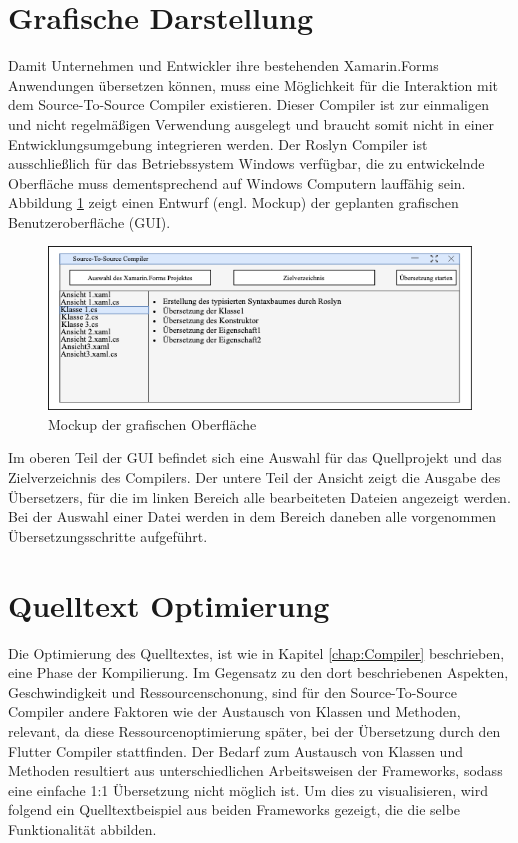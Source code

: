 \section{Grafische Darstellung}
Damit Unternehmen und Entwickler ihre bestehenden Xamarin.Forms Anwendungen übersetzen können, muss eine Möglichkeit für die Interaktion mit dem Source-To-Source Compiler existieren.  Dieser Compiler ist zur einmaligen und nicht regelmäßigen Verwendung ausgelegt und braucht somit nicht in einer Entwicklungsumgebung integrieren werden.  Der Roslyn Compiler ist ausschließlich für das Betriebssystem Windows verfügbar,  die zu entwickelnde Oberfläche muss dementsprechend auf Windows Computern lauffähig sein.  Abbildung \ref{fig:UiMockup} zeigt einen Entwurf (engl. Mockup) der geplanten grafischen Benutzeroberfläche (GUI).

\begin{figure}[!ht]
 \includegraphics[width=\textwidth,keepaspectratio]{Images/CompilerArchitecture/Mockup.png}
 \caption{Mockup der grafischen Oberfläche}
 \label{fig:UiMockup}
\end{figure}

Im oberen Teil der GUI befindet sich eine Auswahl für das Quellprojekt und das Zielverzeichnis des Compilers.  Der untere Teil der Ansicht zeigt die Ausgabe des Übersetzers,  für die im linken Bereich alle bearbeiteten Dateien angezeigt werden.  Bei der Auswahl einer Datei werden in dem Bereich daneben alle vorgenommen Übersetzungsschritte aufgeführt.

\section{Quelltext Optimierung}
Die Optimierung des Quelltextes,  ist wie in Kapitel \ref{chap:Compiler} beschrieben,  eine Phase der Kompilierung.  Im Gegensatz zu den dort beschriebenen Aspekten, Geschwindigkeit und Ressourcenschonung,  sind für den Source-To-Source Compiler andere Faktoren wie der Austausch von Klassen und Methoden, relevant,  da diese Ressourcenoptimierung später, bei der Übersetzung durch den Flutter Compiler stattfinden.   
Der Bedarf zum Austausch von Klassen und Methoden resultiert aus unterschiedlichen Arbeitsweisen der Frameworks,  sodass eine einfache 1:1 Übersetzung nicht möglich ist.  Um dies zu visualisieren, wird folgend ein Quelltextbeispiel aus beiden Frameworks gezeigt,  die die selbe Funktionalität abbilden.

